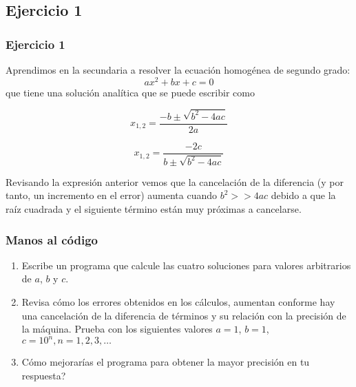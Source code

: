 \documentclass[12pt]{beamer}
\begin{document}
\subsection{Ejercicio 1}
\begin{frame}
\frametitle{Ejercicio 1}
Aprendimos en la secundaria a resolver la ecuaci\'{o}n homog\'{e}nea de segundo grado:
\[ ax^{2} + bx + c = 0\]
que tiene una soluci\'{o}n anal\'{i}tica que se puede escribir como
\\
\medskip
\begin{minipage}{5cm}
\[ x_{1,2} = \dfrac{-b \pm \sqrt{b^{2} - 4ac}}{2a}\]
\end{minipage}
\hspace{0.5cm}
\begin{minipage}{5cm}
\[ x_{1,2} = \dfrac{-2c}{b \pm \sqrt{b^{2}-4ac}}\]
\end{minipage}
\end{frame}
\begin{frame}
Revisando la expresi\'{o}n anterior vemos que la cancelación de la diferencia (y por tanto, un incremento en el error) aumenta cuando $b^{2} >> 4ac$ debido a que la ra\'{i}z cuadrada y el siguiente t\'{e}rmino est\'{a}n muy pr\'{o}ximas a cancelarse.
\end{frame}
\begin{frame}
\frametitle{Manos al c\'{o}digo}
\begin{enumerate}
\item Escribe un programa que calcule las cuatro soluciones para valores arbitrarios de $a$, $b$ y $c$.
\item Revisa c\'{o}mo los errores obtenidos en los c\'{a}lculos, aumentan conforme hay una cancelaci\'{o}n de la diferencia de t\'{e}rminos y su relaci\'{o}n con la precisi\'{o}n de la m\'{a}quina. Prueba con los siguientes valores $a=1$, $b=1$, $c=10^{n}, n=1,2,3,\ldots$
\item C\'{o}mo mejorar\'{i}as el programa para obtener la mayor precisi\'{o}n en tu respuesta?
\end{enumerate}
\end{frame}
\end{document}
